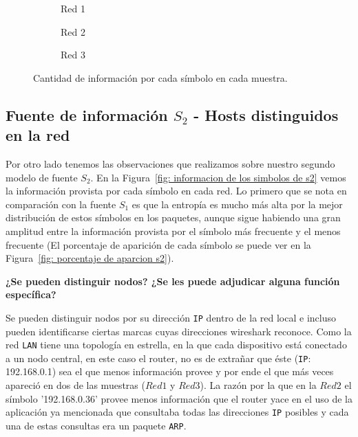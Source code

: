 \begin{figure}[H]
    \centering
    \begin{subfigure}[b]{0.45\textwidth} 
        
        \centering
        \caption{Red 1}
    \end{subfigure}
    \begin{subfigure}[b]{0.45\textwidth} 
        
        \centering
        \caption{Red 2}
    \end{subfigure}
    \begin{subfigure}[b]{0.45\textwidth}  
        \centering
        
        \caption{Red 3}
    \end{subfigure}
    \caption{Cantidad de información por cada símbolo en cada muestra.}
    \label{fig: informacion de los simbolos de s1}
\end{figure}


\subsection{Fuente de información $S_{2}$ - Hosts distinguidos en la red }

Por otro lado tenemos las observaciones que realizamos sobre nuestro segundo modelo de fuente $S_{2}$. En la Figura~\ref{fig: informacion de los simbolos de s2} vemos la información provista por cada símbolo en cada red. Lo primero que se nota en comparación con la fuente $S_{1}$ es que la entropía es mucho más alta por la mejor distribución de estos símbolos en los paquetes, aunque sigue habiendo una gran amplitud entre la información provista por el símbolo más frecuente y el menos frecuente (El porcentaje de aparición de cada símbolo se puede ver en la Figura~\ref{fig: porcentaje de aparcion s2}).

\vspace{4mm}

\textbf{¿Se pueden distinguir nodos? ¿Se les puede adjudicar alguna función específica?}

Se pueden distinguir nodos por su dirección \texttt{IP} dentro de la red local e incluso pueden identificarse ciertas marcas cuyas direcciones wireshark reconoce. Como la red \texttt{LAN} tiene una topología en estrella, en la que cada dispositivo está conectado a un nodo central, en este caso el router, no es de extrañar que éste (\texttt{IP}: 192.168.0.1) sea el que menos información provee y por ende el que más veces apareció en dos de las muestras ($Red1$ y $Red3$). La razón por la que en la $Red2$ el símbolo '192.168.0.36' provee menos información que el router yace en el uso de la aplicación ya mencionada que consultaba todas las direcciones \texttt{IP} posibles y cada una de estas consultas era un paquete \texttt{ARP}.

